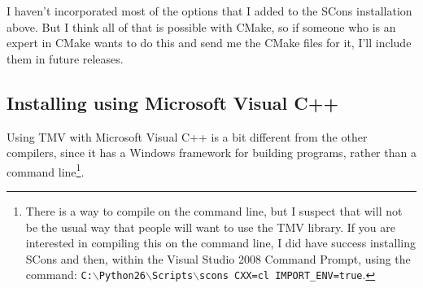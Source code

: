 I haven't incorporated most of the options that I added to the SCons installation above.
But I think all of that is possible with CMake, so if someone who is an expert in CMake wants
to do this and send me the CMake files for it, I'll include them in future releases.

\subsection{Installing using Microsoft Visual C++}
\label{Install_Microsoft}

Using TMV with Microsoft Visual C++ is a bit different from the other compilers,
since it has a Windows framework for building programs, rather than a command 
line\footnote{
There is a way to compile on the command line, but I suspect that will not be the 
usual way that people will want to use the TMV library.  If you are interested in compiling
this on the command line, I did have success installing SCons and then, within the
Visual Studio 2008 Command Prompt, using the command:
\texttt{C:$\backslash$Python26$\backslash$Scripts$\backslash$scons CXX=cl IMPORT\_ENV=true}.}.


